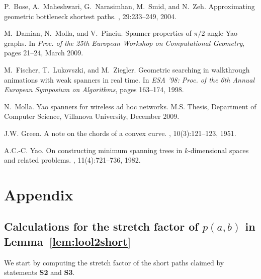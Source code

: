 \pdfoutput=1  \documentclass[11pt]{article}
\begin{document}
\def\cprime{$'$}
\begin{thebibliography}{1}

P.~Bose, A.~Maheshwari, G.~Narasimhan, M.~Smid, and N.~Zeh.
\newblock Approximating geometric bottleneck shortest paths.
, 29:233--249,
  2004.

M.~Damian, N.~Molla, and V.~Pinciu.
\newblock Spanner properties of $\pi/2$-angle Yao graphs.
\newblock In {\em Proc. of the 25th European Workshop on Computational
  Geometry}, pages 21--24, March 2009.

M.~Fischer, T.~Lukovszki, and M.~Ziegler.
\newblock Geometric searching in walkthrough animations with weak spanners in
  real time.
\newblock In {\em {ESA} '98: Proc. of the 6th Annual European Symposium on
  Algorithms}, pages 163--174, 1998.

N.~Molla.
\newblock Yao spanners for wireless ad hoc networks.
\newblock M.S. Thesis, Department of Computer Science, Villanova University, December 2009.

J.W. Green.
\newblock A note on the chords of a convex curve.
, 10(3):121--123, 1951.

A.C.-C. Yao.
\newblock On constructing minimum spanning trees in $k$-dimensional spaces and
  related problems.
, 11(4):721--736, 1982.

\end{thebibliography}

\section{Appendix}
\label{sec:appendix}
\subsection{Calculations for the stretch factor of $p(a,b)$ in Lemma~\ref{lem:lool2short}}
We start by computing the stretch factor of the short paths claimed by statements {\bf S2}
and {\bf S3}.
\end{document}
